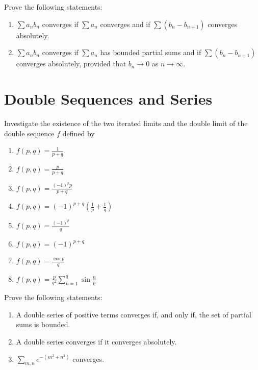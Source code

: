 \begin{problembox}
Prove the following statements:
\begin{enumerate}[label=\alph*)]
\item \(\sum a_n b_n\) converges if \(\sum a_n\) converges and if \(\sum (b_n - b_{n+1})\) converges absolutely.
\item \(\sum a_n b_n\) converges if \(\sum a_n\) has bounded partial sums and if \(\sum (b_n - b_{n+1})\) converges absolutely, provided that \(b_n \to 0\) as \(n \to \infty\).
\end{enumerate}
\end{problembox}

\section{Double Sequences and Series}

\begin{problembox}
Investigate the existence of the two iterated limits and the double limit of the double sequence \(f\) defined by
\begin{enumerate}[label=\alph*)]
\item \( f(p, q) = \frac{1}{p + q}\)
\item \( f(p, q) = \frac{p}{p + q}\)
\item \( f(p, q) = \frac{(-1)^p p}{p + q}\)
\item \( f(p, q) = (-1)^{p+q} \left( \frac{1}{p} + \frac{1}{q} \right)\)
\item \( f(p, q) = \frac{(-1)^p}{q}\)
\item \( f(p, q) = (-1)^{p+q}\)
\item \( f(p, q) = \frac{\cos p}{q}\)
\item \( f(p, q) = \frac{p}{q^2} \sum_{n=1}^{q} \sin \frac{n}{p}\)
\end{enumerate}
\end{problembox}

\begin{problembox}
Prove the following statements:
\begin{enumerate}[label=\alph*)]
\item A double series of positive terms converges if, and only if, the set of partial sums is bounded.
\item A double series converges if it converges absolutely.
\item \(\sum_{m,n} e^{-(m^2+n^2)}\) converges.
\end{enumerate}
\end{problembox}

